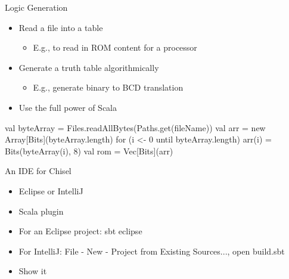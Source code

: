 \documentclass[xcolor=pdflatex,dvipsnames,table]{beamer}
\begin{document}
\begin{frame}[fragile]{Logic Generation}
\begin{itemize}
\item Read a file into a table
\begin{itemize}
\item E.g., to read in ROM content for a processor
\end{itemize}
\item Generate a truth table algorithmically
\begin{itemize}
\item E.g., generate binary to BCD translation
\end{itemize}
\item Use the full power of Scala
\end{itemize}
\begin{chisel}
val byteArray = Files.readAllBytes(Paths.get(fileName))
val arr = new Array[Bits](byteArray.length)
for (i <- 0 until byteArray.length) {
  arr(i) = Bits(byteArray(i), 8)
}
val rom = Vec[Bits](arr)
\end{chisel}
\end{frame}
%



\begin{frame}[fragile]{An IDE for Chisel}
\begin{itemize}
\item Eclipse or IntelliJ
\item Scala plugin
\item For an Eclipse project: sbt eclipse
\item For IntelliJ: File - New - Project from Existing Sources..., open build.sbt
\item Show it
\end{itemize}
\end{frame}
\end{document}
